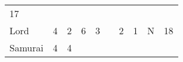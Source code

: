 \documentclass[12pt]{article}
\begin{document}
\begin{longtable}[]{@{}llllllllll@{}}
\begin{minipage}[t]{0.08\columnwidth}\raggedright\strut
17
\strut\end{minipage}\tabularnewline
\begin{minipage}[t]{0.13\columnwidth}\raggedright\strut
Lord
\strut\end{minipage} &
\begin{minipage}[t]{0.06\columnwidth}\raggedright\strut
4
\strut\end{minipage} &
\begin{minipage}[t]{0.06\columnwidth}\raggedright\strut
2
\strut\end{minipage} &
\begin{minipage}[t]{0.06\columnwidth}\raggedright\strut
6
\strut\end{minipage} &
\begin{minipage}[t]{0.06\columnwidth}\raggedright\strut
3
\strut\end{minipage} &
\begin{minipage}[t]{0.06\columnwidth}\raggedright\strut
\strut\end{minipage} &
\begin{minipage}[t]{0.06\columnwidth}\raggedright\strut
2
\strut\end{minipage} &
\begin{minipage}[t]{0.06\columnwidth}\raggedright\strut
1
\strut\end{minipage} &
\begin{minipage}[t]{0.07\columnwidth}\raggedright\strut
N
\strut\end{minipage} &
\begin{minipage}[t]{0.08\columnwidth}\raggedright\strut
18
\strut\end{minipage}\tabularnewline
\begin{minipage}[t]{0.13\columnwidth}\raggedright\strut
Samurai
\strut\end{minipage} &
\begin{minipage}[t]{0.06\columnwidth}\raggedright\strut
4
\strut\end{minipage} &
\begin{minipage}[t]{0.06\columnwidth}\raggedright\strut
4
\strut\end{minipage} &
\begin{minipage}[t]{0.06\columnwidth}\raggedright\strut
\strut\end{minipage} &
\begin{minipage}[t]{0.06\columnwidth}\raggedright\strut
\strut\end{minipage} &

\end{longtable}
\end{document}

